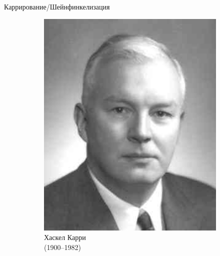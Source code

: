 \begin{frame}{Каррирование/Шейнфинкелизация}
\begin{figure}[t]
\begin{subfigure}[t]{.25\textwidth}
\begin{minipage}{1\textwidth}
      \includegraphics[width=1\textwidth]{Haskell_Curry.jpg}\\
      \centering Хаскел Карри \\(1900--1982)
    \end{minipage}
  \end{subfigure}
\end{figure}
\end{frame}



